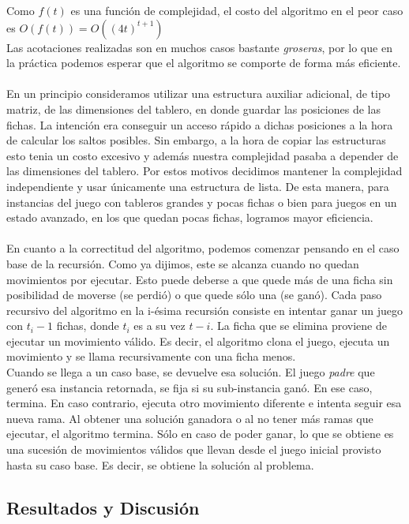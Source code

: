 \documentclass[10pt, a4paper,english,spanish]{article}
\begin{document}
Como $f(t)$ es una función de complejidad, el costo del algoritmo en el peor caso es $O(f(t)) = O((4t)^{t+1})$ \\
Las acotaciones realizadas son en muchos casos bastante \textit{groseras}, por lo que en la práctica podemos esperar
que el algoritmo se comporte de forma más eficiente.
\\\\
\indent En un principio consideramos utilizar una estructura auxiliar adicional, de tipo matriz, de las dimensiones del tablero, en donde guardar 
las posiciones de las fichas. La intención era conseguir un acceso rápido a dichas posiciones a la hora de calcular los saltos posibles. 
Sin embargo, a la hora de copiar las estructuras esto tenia un costo excesivo y además nuestra complejidad pasaba a depender de las dimensiones 
del tablero. 
Por estos motivos decidimos mantener la complejidad independiente y usar únicamente una estructura de lista. 
De esta manera, para instancias del juego con tableros grandes y pocas fichas o bien para juegos en un estado avanzado, en 
los que quedan pocas fichas, logramos mayor eficiencia.
\\\\
\indent En cuanto a la correctitud del algoritmo, podemos comenzar pensando en el caso base de la recursión. Como ya dijimos,
este se alcanza cuando no quedan movimientos por ejecutar. Esto puede deberse a que quede más de una ficha sin posibilidad
de moverse (se perdió) o que quede sólo una (se ganó). Cada paso recursivo del algoritmo en la i-ésima recursión consiste
en intentar ganar un juego con $t_{i} - 1$ fichas, donde $t_{i}$ es a su vez $t - i$. La ficha que se elimina proviene
de ejecutar un movimiento válido. Es decir, el algoritmo clona el juego, ejecuta un movimiento y se llama recursivamente con una ficha menos.
\\ 
\indent Cuando se llega a un caso base, se devuelve esa solución. El juego \textit{padre} que generó esa instancia retornada,
se fija si su sub-instancia ganó. En ese caso, termina. En caso contrario, ejecuta otro movimiento diferente e intenta seguir esa 
nueva rama. Al obtener una solución ganadora o al no tener más ramas que ejecutar, el algoritmo termina. Sólo en caso de 
poder ganar, lo que se obtiene es una sucesión de movimientos válidos que llevan desde el juego inicial provisto hasta su caso base.
Es decir, se obtiene la solución al problema.


\subsection{Resultados y Discusión}
\end{document}
